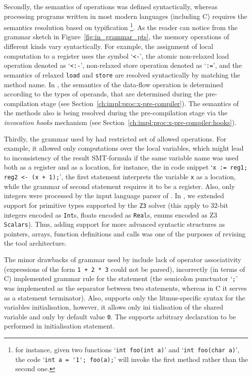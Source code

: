 Secondly, the semantics of operations was defined syntactically, whereas processing programs written in most modern languages (including C) requires the semantics resolution based on typification%
\footnote{for instance, given two functions
`\lstinline{int foo(int a)}' and `\lstinline{int foo(char a)}', the code `\lstinline{int a = '1'; foo(a);}' will invoke the first method rather than the second one.}.%
As the reader can notice from the grammar sketch in Figure~\ref{fig:in_grammar_pts}, the memory operations of different kinds vary syntactically. For example, the assignment of local computation to a register uses the symbol `\lstinline{<-}', the atomic non-relaxed load operation denoted as `\lstinline{<:-}', non-relaxed store operation denoted as `\lstinline{:=}', and the semantics of relaxed \lstinline{load} and \lstinline{store} are resolved syntactically by matching the method name. In \porthos[2], the semantics of the data-flow operation is determined according to the types of operands, that are determined during the pre-compilation stage (see Section~\ref{ch:impl:proc:x-pre-compiler}). The semantics of the methods also is being resolved during the pre-compilation stage via the \textit{invocation hooks} mechanism (see Section~\ref{ch:impl:proc:x-pre-compiler:hooks}).

Thirdly, the grammar used by \porthos{} had restricted set of allowed operations. For example, it allowed only computations over the local variables, which might lead to inconsistency of the result SMT-formula if the same variable name was used both as a register and as a location, for instance, the in code snippet `\lstinline{x := reg1; reg2 <- (x + 1);}', the first statement interprets the variable \lstinline{x} as a location, while the grammar of second statement requires it to be a register. Also, only integers were processed by the input language parser of \porthos[1]. In \porthos[2], we extended support for primitive types supported by the \texttt{Z3} solver (this apply to 32-bit integers encoded as \texttt{Int}s, floats encoded as \texttt{Real}s, enums encoded as Z3 \texttt{Scalars}).
Thus, adding support for more advanced syntactic structures as pointers, arrays, function definitions and calls was one of the purposes of revising the tool architecture.

The minor drawbacks of grammar used by \porthos[1] include lack of operator associativity (expressions of the form \lstinline{1 + 2 * 3} could not be parsed), incorrectly (in terms of C) implemented grammar rule for the statement (the semicolon punctuator `\lstinline{;}' was implemented as the separator between two statements, whereas in C it serves as a statement terminator). Also, \porthos[1] supports only the litmus-specific syntax for the variables initialisation, however, it allows only ini
tialisation of the shared variable and only by default value \lstinline{0}. The \porthos[2] supports arbitrary declaration to be performed in initialisation statement.


